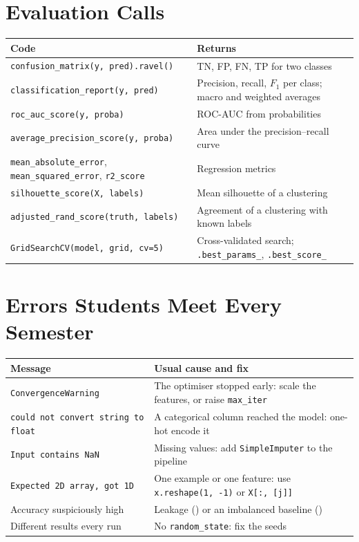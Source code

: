 \section{Evaluation Calls}

\begin{longtable}{@{}L{6.4cm}L{8.6cm}@{}}
\toprule
{}
\textbf{Code} & \textbf{Returns} \\
\midrule
\endhead
\texttt{confusion\_matrix(y, pred).ravel()} & TN, FP, FN, TP for two classes \\
\texttt{classification\_report(y, pred)} & Precision, recall, $F_1$ per class; macro and weighted averages \\
\texttt{roc\_auc\_score(y, proba)} & ROC-AUC from probabilities \\
\texttt{average\_precision\_score(y, proba)} & Area under the precision--recall curve \\
\texttt{mean\_absolute\_error}, \texttt{mean\_squared\_error}, \texttt{r2\_score} & Regression metrics \\
\texttt{silhouette\_score(X, labels)} & Mean silhouette of a clustering \\
\texttt{adjusted\_rand\_score(truth, labels)} & Agreement of a clustering with known labels \\
\texttt{GridSearchCV(model, grid, cv=5)} & Cross-validated search; \texttt{.best\_params\_}, \texttt{.best\_score\_} \\
\bottomrule
\end{longtable}

\section{Errors Students Meet Every Semester}

\begin{longtable}{@{}L{5.4cm}L{9.6cm}@{}}
\toprule
{}
\textbf{Message} & \textbf{Usual cause and fix} \\
\midrule
\endhead
\texttt{ConvergenceWarning} & The optimiser stopped early: scale the features, or raise \texttt{max\_iter} \\
\texttt{could not convert string to float} & A categorical column reached the model: one-hot encode it \\
\texttt{Input contains NaN} & Missing values: add \texttt{SimpleImputer} to the pipeline \\
\texttt{Expected 2D array, got 1D} & One example or one feature: use \texttt{x.reshape(1, -1)} or \texttt{X[:, [j]]} \\
Accuracy suspiciously high & Leakage () or an imbalanced baseline () \\
Different results every run & No \texttt{random\_state}: fix the seeds \\
\bottomrule
\end{longtable}
